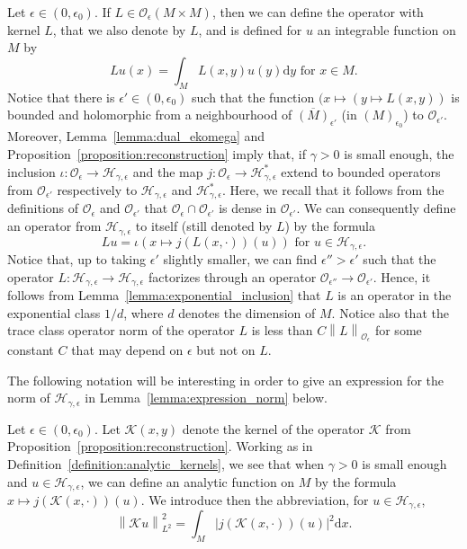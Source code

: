 \documentclass[AHL,Unicode,longabstracts,published]{cedram}
\newcommand{\p}[1]{\left(#1\right)}
\newcommand{\n}[1]{\left\|#1\right\|}
\newcommand{\va}[1]{\left|#1\right|}
\newcommand{\clO}{\mathcal{O}}
\newcommand{\clH}{\mathcal{H}}
\newcommand{\clK}{\mathcal{K}}
\newcommand{\rmd}{\mathrm{d}}
\newcommand{\clO}{\mathcal{O}}
\begin{document}
\begin{defi}\label{definition:analytic_kernels}
Let $\epsilon \in (0,\epsilon_0)$. If $L \in \clO_\epsilon(M \times M)$, then we can define the operator with kernel $L$, that we also denote by $L$, and is defined for $u$ an integrable function on $M$ by
\begin{equation*}
Lu (x) = \int_M L(x,y) u(y) \rmd y \text{ for } x \in M.
\end{equation*}
Notice that there is $\epsilon' \in (0,\epsilon_0)$ such that the function $(x \mapsto (y \mapsto L(x,y))$ is bounded and holomorphic from a neighbourhood of $\overline{(M)}_{\epsilon'}$ (in $(M)_{\epsilon_0}$) to $\clO_{\epsilon'}$. Moreover, Lemma~\ref{lemma:dual_ekomega} and Proposition~\ref{proposition:reconstruction} imply that, if $\gamma > 0$ is small enough, the inclusion $\iota : \clO_\epsilon \to \clH_{\gamma,\epsilon}$ and the map $j : \clO_\epsilon \to \clH_{\gamma,\epsilon}^*$ extend to bounded operators from $\clO_{\epsilon'}$ respectively to $\clH_{\gamma,\epsilon}$ and $\clH_{\gamma,\epsilon}^*$. Here, we recall that it follows from the definitions of $\clO_\epsilon$ and $\clO_{\epsilon'}$ that $\clO_{\epsilon} \cap \clO_{\epsilon'}$ is dense in $\clO_{\epsilon'}$. We can consequently define an operator from $\clH_{\gamma,\epsilon}$ to itself (still denoted by $L$) by the formula
\begin{equation*}
L u = \iota \p{ x \mapsto j(L(x,\cdot))(u)} \text{ for } u \in \clH_{\gamma,\epsilon}.
\end{equation*}
Notice that, up to taking $\epsilon'$ slightly smaller, we can find $\epsilon'' > \epsilon'$ such that the operator $L : \clH_{\gamma,\epsilon} \to \clH_{\gamma,\epsilon}$ factorizes through an operator $\clO_{\epsilon''} \to \clO_{\epsilon'}$. Hence, it follows from Lemma~\ref{lemma:exponential_inclusion} that $L$ is an operator in the exponential class $1/d$, where $d$ denotes the dimension of $M$. Notice also that the trace class operator norm of the operator $L$ is less than $C \n{L}_{\clO_\epsilon}$ for some constant $C$ that may depend on $\epsilon$ but not on $L$.
\end{defi}

The following notation will be interesting in order to give an expression for the norm of $\clH_{\gamma,\epsilon}$ in Lemma~\ref{lemma:expression_norm} below.

\begin{defi}
Let $\epsilon \in (0,\epsilon_0)$. Let $\clK (x,y)$ denote the kernel of the operator $\clK $ from Proposition~\ref{proposition:reconstruction}. Working as in Definition~\ref{definition:analytic_kernels}, we see that when $\gamma > 0$ is small enough and $u \in \clH_{\gamma,\epsilon}$, we can define an analytic function on $M$ by the formula $x \mapsto j(\clK (x,\cdot))(u)$. We introduce then the abbreviation, for $u \in \clH_{\gamma,\epsilon}$,
\begin{equation*}
\n{\clK u}_{L^2}^2 = \int_M \va{j(\clK (x,\cdot))(u)}^2 \rmd x.
\end{equation*}
\end{defi}
\end{document}

